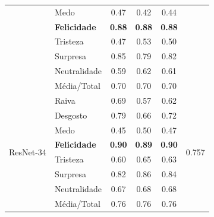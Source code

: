 \documentclass{beamer}
\begin{document}
\begin{frame}
\begin{table}[]
\begin{tabular}{llcccc}
                                    & Medo                  & 0.47              & 0.42               & 0.44              &                                 \\
                                    & \scriptsize \textbf{Felicidade}            & \scriptsize \textbf{0.88}              & \scriptsize \textbf{0.88}               & \scriptsize \textbf{0.88}              &                                 \\
                                    & Tristeza              & 0.47              & 0.53               & 0.50              &                                 \\
                                    & Surpresa              & 0.85              & 0.79               & 0.82              &                                 \\
                                    & Neutralidade          & 0.59              & 0.62               & 0.61              &                                 \\
                                    & Média/Total           & 0.70              & 0.70               & 0.70              &                                 \\ \hline
\multirow{8}{*}{ResNet-34} & Raiva        & 0.69     & 0.57      & 0.62     & \multirow{8}{*}{0.757} \\
                                    & Desgosto     & 0.79     & 0.66      & 0.72     &                                 \\
                                    & Medo         & 0.45     & 0.50      & 0.47     &                                 \\
                                    & \scriptsize \textbf{Felicidade}   & \scriptsize \textbf{0.90}     & \scriptsize \textbf{0.89}      & \scriptsize \textbf{0.90}     &                                 \\
                                    & Tristeza     & 0.60     & 0.65      & 0.63     &                                 \\
                                    & Surpresa     & 0.82     & 0.86      & 0.84     &                                 \\
                                    & Neutralidade & 0.67     & 0.68      & 0.68     &                                 \\
                                    & Média/Total  & 0.76     & 0.76      & 0.76     &                                 \\ \hline
\end{tabular}
\end{table} 
\end{frame}
\end{document}
